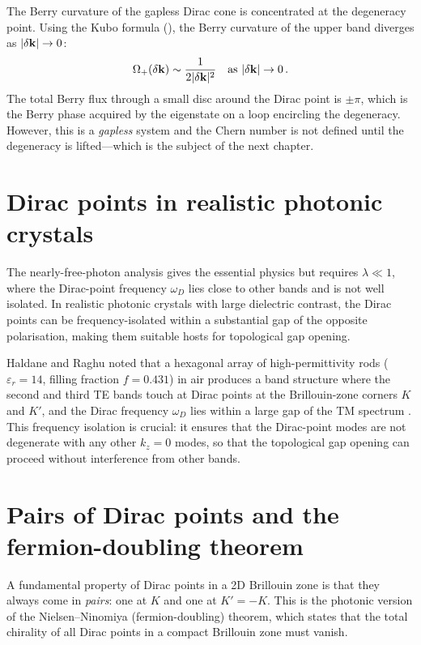 The Berry curvature of the gapless Dirac cone is concentrated at the
degeneracy point.  Using the Kubo formula
(), the Berry curvature of the upper band
diverges as $|\delta\mathbf{k}|\to 0$:
\begin{equation}
  \Omega_+(\delta\mathbf{k})
  \sim \frac{1}{2|\delta\mathbf{k}|^2}
  \quad\text{as } |\delta\mathbf{k}|\to 0\,.
\end{equation}
The total Berry flux through a small disc around the Dirac point is
$\pm\pi$, which is the Berry phase acquired by the eigenstate on
a loop encircling the degeneracy.  However, this is a \emph{gapless}
system and the Chern number is not defined until the degeneracy is
lifted---which is the subject of the next chapter.

\section{Dirac points in realistic photonic crystals}
\label{sec:ch6-realistic}

The nearly-free-photon analysis gives the essential physics but requires
$\lambda\ll 1$, where the Dirac-point frequency $\omega_D$ lies close
to other bands and is not well isolated.  In realistic photonic crystals
with large dielectric contrast, the Dirac points can be frequency-isolated
within a substantial gap of the opposite polarisation, making them
suitable hosts for topological gap opening.

Haldane and Raghu noted that a hexagonal array of high-permittivity
rods ($\varepsilon_r=14$, filling fraction $f=0.431$) in air produces a
band structure where the second and third TE bands touch at Dirac points
at the Brillouin-zone corners $K$ and $K'$, and the Dirac frequency
$\omega_D$ lies within a large gap of the TM spectrum
\cite{haldane2008possible}.  This frequency isolation is crucial: it
ensures that the Dirac-point modes are not degenerate with any other
$k_z=0$ modes, so that the topological gap opening can proceed without
interference from other bands.

\section{Pairs of Dirac points and the fermion-doubling theorem}
\label{sec:ch6-pairs}

A fundamental property of Dirac points in a 2D Brillouin zone is that
they always come in \emph{pairs}: one at $K$ and one at $K'=-K$.  This
is the photonic version of the Nielsen--Ninomiya (fermion-doubling)
theorem, which states that the total chirality of all Dirac points in a
compact Brillouin zone must vanish.

